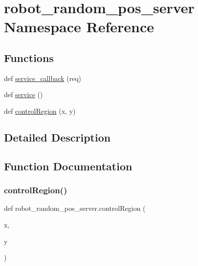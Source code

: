 \hypertarget{namespacerobot__random__pos__server}{}\section{robot\+\_\+random\+\_\+pos\+\_\+server Namespace Reference}
\label{namespacerobot__random__pos__server}
\subsection*{Functions}
\begin{DoxyCompactItemize}
\item 
def \hyperlink{namespacerobot__random__pos__server_aceaff9b2bc697fa68003e31ff6bad64d}{service\+\_\+callback} (req)
\item 
def \hyperlink{namespacerobot__random__pos__server_afe92a3a118f503a82da63433c30f9a5d}{service} ()
\item 
def \hyperlink{namespacerobot__random__pos__server_ab383e0c75fed6b4bdf47600fbbcbd129}{control\+Region} (x, y)
\end{DoxyCompactItemize}


\subsection{Detailed Description}
\begin{DoxyVerb}\end{DoxyVerb}
 

\subsection{Function Documentation}
\mbox{\label{namespacerobot__random__pos__server_ab383e0c75fed6b4bdf47600fbbcbd129}} 
\subsubsection{\texorpdfstring{control\+Region()}{controlRegion()}}
{\footnotesize\ttfamily def robot\+\_\+random\+\_\+pos\+\_\+server.\+control\+Region (\begin{DoxyParamCaption}\item[{}]{x,  }\item[{}]{y }\end{DoxyParamCaption})}

